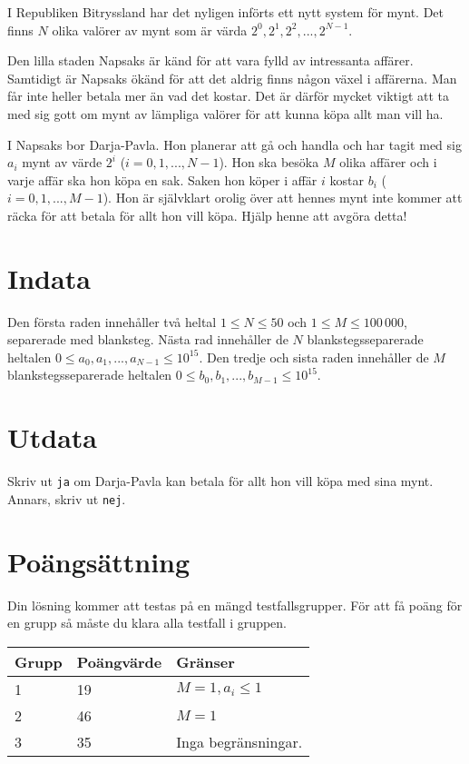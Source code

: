 I Republiken Bitryssland har det nyligen införts ett nytt system för mynt.
Det finns $N$ olika valörer av mynt som är värda $2^0, 2^1, 2^2, ..., 2^{N-1}$. 

Den lilla staden Napsaks är känd för att vara fylld av intressanta affärer.
Samtidigt är Napsaks ökänd för att det aldrig finns någon växel i affärerna.
Man får inte heller betala mer än vad det kostar.
Det är därför mycket viktigt att ta med sig gott om mynt av lämpliga valörer för att kunna köpa allt man vill ha. 

I Napsaks bor Darja-Pavla.
Hon planerar att gå och handla och har tagit med sig $a_i$ mynt av värde $2^i$ ($i = 0, 1, ..., N-1$).
Hon ska besöka $M$ olika affärer och i varje affär ska hon köpa en sak.
Saken hon köper i affär $i$ kostar $b_i$ ($i = 0, 1, ..., M-1$).
Hon är självklart orolig över att hennes mynt inte kommer att räcka för att betala för allt hon vill köpa. Hjälp henne att avgöra detta!

\section*{Indata}
Den första raden innehåller två heltal $1 \le N \le 50$ och $1 \le M \le 100\,000$, separerade med blanksteg.
Nästa rad innehåller de $N$ blankstegsseparerade heltalen $0 \le a_0, a_1, ..., a_{N-1} \le 10^{15}$.
Den tredje och sista raden innehåller de $M$ blankstegsseparerade heltalen $0 \le b_0, b_1, ..., b_{M-1} \le 10^{15}$.

\section*{Utdata}
Skriv ut \texttt{ja} om Darja-Pavla kan betala för allt hon vill köpa med sina mynt.
Annars, skriv ut \texttt{nej}.

\section*{Poängsättning}
Din lösning kommer att testas på en mängd testfallsgrupper. För att få poäng för en grupp
så måste du klara alla testfall i gruppen.

\noindent
\begin{tabular}{| l | l | l |}
\hline
Grupp & Poängvärde & Gränser \\ \hline
1     & 19         & $M = 1, a_i \le 1$ \\ \hline
2     & 46         & $M = 1$ \\ \hline
3     & 35         & Inga begränsningar. \\ \hline
\end{tabular}

